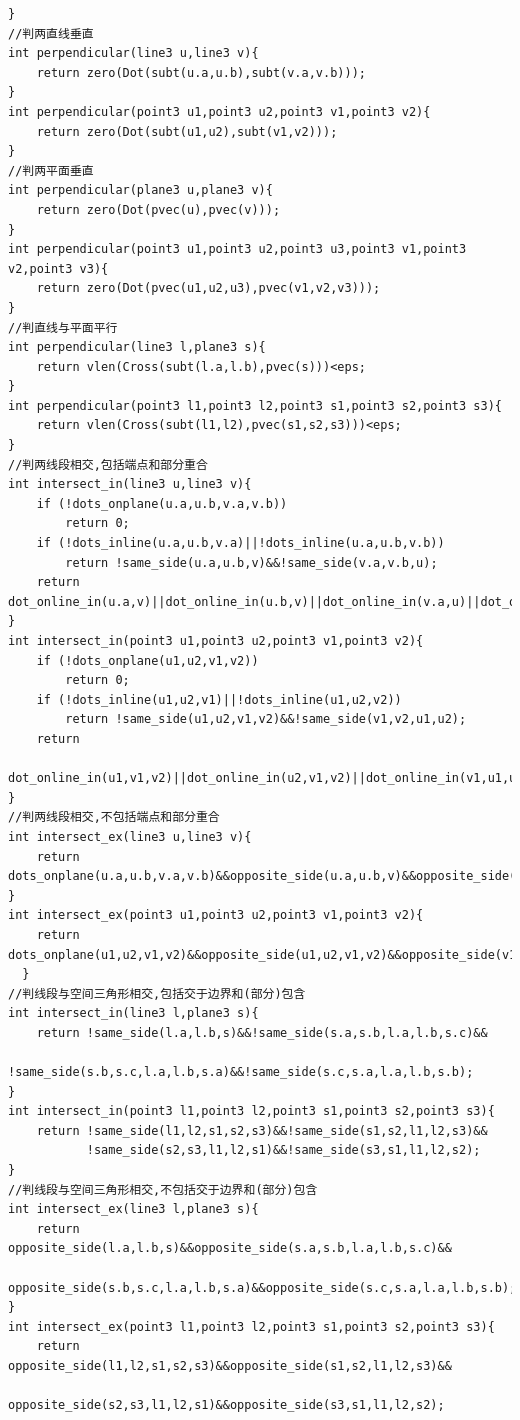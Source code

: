 \documentclass[twoside]{article}
\begin{document}
\begin{lstlisting}
}
//判两直线垂直 
int perpendicular(line3 u,line3 v){
    return zero(Dot(subt(u.a,u.b),subt(v.a,v.b)));
}
int perpendicular(point3 u1,point3 u2,point3 v1,point3 v2){
    return zero(Dot(subt(u1,u2),subt(v1,v2)));
}
//判两平面垂直 
int perpendicular(plane3 u,plane3 v){
    return zero(Dot(pvec(u),pvec(v)));
}
int perpendicular(point3 u1,point3 u2,point3 u3,point3 v1,point3 v2,point3 v3){
    return zero(Dot(pvec(u1,u2,u3),pvec(v1,v2,v3)));
}
//判直线与平面平行 
int perpendicular(line3 l,plane3 s){
    return vlen(Cross(subt(l.a,l.b),pvec(s)))<eps;
}
int perpendicular(point3 l1,point3 l2,point3 s1,point3 s2,point3 s3){
    return vlen(Cross(subt(l1,l2),pvec(s1,s2,s3)))<eps;
}
//判两线段相交,包括端点和部分重合 
int intersect_in(line3 u,line3 v){
    if (!dots_onplane(u.a,u.b,v.a,v.b))
        return 0;
    if (!dots_inline(u.a,u.b,v.a)||!dots_inline(u.a,u.b,v.b))
        return !same_side(u.a,u.b,v)&&!same_side(v.a,v.b,u);
    return dot_online_in(u.a,v)||dot_online_in(u.b,v)||dot_online_in(v.a,u)||dot_online_in(v.b,u);
}
int intersect_in(point3 u1,point3 u2,point3 v1,point3 v2){
    if (!dots_onplane(u1,u2,v1,v2))
        return 0;
    if (!dots_inline(u1,u2,v1)||!dots_inline(u1,u2,v2))
        return !same_side(u1,u2,v1,v2)&&!same_side(v1,v2,u1,u2);
    return
            dot_online_in(u1,v1,v2)||dot_online_in(u2,v1,v2)||dot_online_in(v1,u1,u2)||dot_online_in(v2,u1,u2);
}
//判两线段相交,不包括端点和部分重合 
int intersect_ex(line3 u,line3 v){
    return dots_onplane(u.a,u.b,v.a,v.b)&&opposite_side(u.a,u.b,v)&&opposite_side(v.a,v.b,u);
}
int intersect_ex(point3 u1,point3 u2,point3 v1,point3 v2){
    return  dots_onplane(u1,u2,v1,v2)&&opposite_side(u1,u2,v1,v2)&&opposite_side(v1,v2,u1,u2);
  }
//判线段与空间三角形相交,包括交于边界和(部分)包含 
int intersect_in(line3 l,plane3 s){
    return !same_side(l.a,l.b,s)&&!same_side(s.a,s.b,l.a,l.b,s.c)&&
           !same_side(s.b,s.c,l.a,l.b,s.a)&&!same_side(s.c,s.a,l.a,l.b,s.b);
}
int intersect_in(point3 l1,point3 l2,point3 s1,point3 s2,point3 s3){
    return !same_side(l1,l2,s1,s2,s3)&&!same_side(s1,s2,l1,l2,s3)&&
           !same_side(s2,s3,l1,l2,s1)&&!same_side(s3,s1,l1,l2,s2);
}
//判线段与空间三角形相交,不包括交于边界和(部分)包含 
int intersect_ex(line3 l,plane3 s){
    return opposite_side(l.a,l.b,s)&&opposite_side(s.a,s.b,l.a,l.b,s.c)&&
           opposite_side(s.b,s.c,l.a,l.b,s.a)&&opposite_side(s.c,s.a,l.a,l.b,s.b);
}
int intersect_ex(point3 l1,point3 l2,point3 s1,point3 s2,point3 s3){
    return opposite_side(l1,l2,s1,s2,s3)&&opposite_side(s1,s2,l1,l2,s3)&&
           opposite_side(s2,s3,l1,l2,s1)&&opposite_side(s3,s1,l1,l2,s2);

\end{lstlisting}
\end{document}
